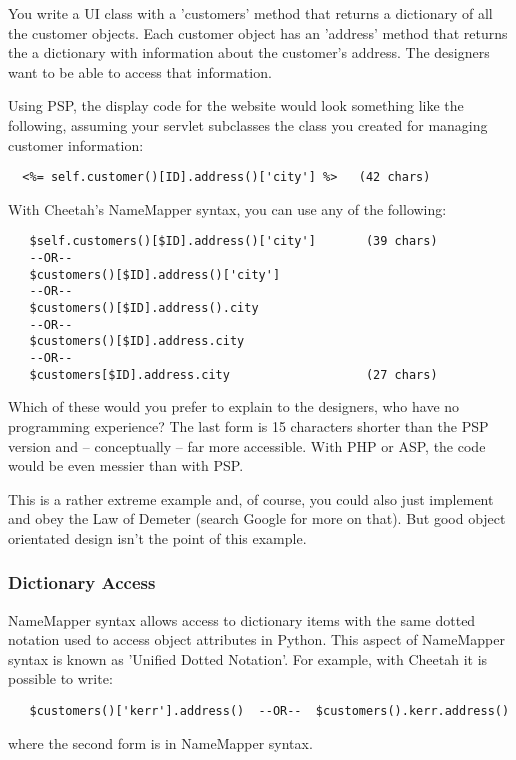 You write a UI class with a 'customers' method that returns a dictionary of all
the customer objects.  Each customer object has an 'address' method that returns
the a dictionary with information about the customer's address.  The designers
want to be able to access that information.

Using PSP, the display code for the website would look something like the
following, assuming your servlet subclasses the class you created for managing
customer information:

\begin{verbatim}
  <%= self.customer()[ID].address()['city'] %>   (42 chars)
\end{verbatim}

With Cheetah's NameMapper syntax, you can use any of the following:

\begin{verbatim}
   $self.customers()[$ID].address()['city']       (39 chars)
   --OR--                                         
   $customers()[$ID].address()['city']           
   --OR--                                         
   $customers()[$ID].address().city              
   --OR--                                         
   $customers()[$ID].address.city                
   --OR--                                         
   $customers[$ID].address.city                   (27 chars)                     
\end{verbatim}   

Which of these would you prefer to explain to the designers, who have no
programming experience?  The last form is 15 characters shorter than the PSP
version and -- conceptually -- far more accessible. With PHP or ASP, the
code would be even messier than with PSP.

This is a rather extreme example and, of course, you could also just implement
 and obey the Law of Demeter (search Google for more
on that).  But good object orientated design isn't the point of this example.

\subsubsection{Dictionary Access}
\label{language.namemapper.dict}

NameMapper syntax allows access to dictionary items with the same dotted
notation used to access object attributes in Python.  This aspect of NameMapper
syntax is known as 'Unified Dotted Notation'.
For example, with Cheetah it is possible to write:
\begin{verbatim}
   $customers()['kerr'].address()  --OR--  $customers().kerr.address()
\end{verbatim}
where the second form is in NameMapper syntax.

